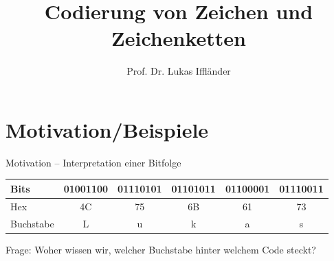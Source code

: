 \documentclass[xelatex,aspectratio=169]{beamer}
\title{Codierung von Zeichen und Zeichenketten}
\author{Prof. Dr. Lukas Iffländer}
\institute{HTW Dresden}
\date{}
\begin{document}
\begin{frame}
    \titlepage
\end{frame}

\section{Motivation/Beispiele}

\begin{frame}{Motivation – Interpretation einer Bitfolge}
    \begin{center}
        \begin{tabular}{lccccc}
            \toprule
            Bits      & 01001100 & 01110101 & 01101011 & 01100001 & 01110011 \\
            \midrule
            Hex       & 4C       & 75       & 6B       & 61       & 73       \\
            \midrule
            Buchstabe & L        & u        & k        & a        & s        \\
            \bottomrule
        \end{tabular}
    \end{center}
    \begin{alertblock}{Frage:}
        Woher wissen wir, welcher Buchstabe hinter welchem Code steckt?
    \end{alertblock}
\end{frame}
\end{document}
